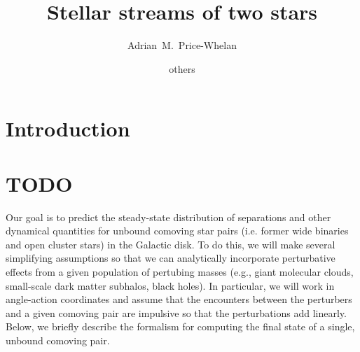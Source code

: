 \documentclass[modern, letterpaper]{aastex61}
\begin{document}
\sloppy\sloppypar\raggedbottom\frenchspacing %

\title{Stellar streams of two stars}

\author{Adrian~M.~Price-Whelan}

\author{others}



\begin{abstract}
\end{abstract}

\keywords{
}

\section{Introduction}\label{sec:introduction}


\section{TODO} %

Our goal is to predict the steady-state distribution of separations and other
dynamical quantities for unbound comoving star pairs (i.e. former wide binaries
and open cluster stars) in the Galactic disk.
To do this, we will make several simplifying assumptions so that we can
analytically incorporate perturbative effects from a given population of
pertubing masses (e.g., giant molecular clouds, small-scale dark matter
subhalos, black holes).
In particular, we will work in angle-action coordinates and assume that the
encounters between the perturbers and a given comoving pair are impulsive so
that the perturbations add linearly.
Below, we briefly describe the formalism for computing the final state of a
single, unbound comoving pair.
\end{document}
